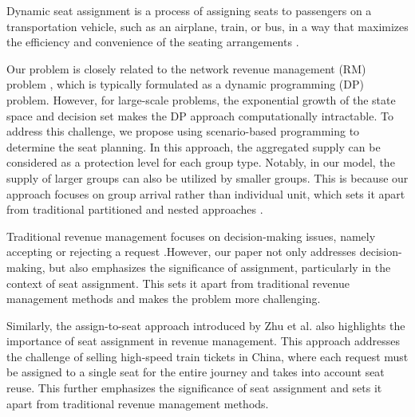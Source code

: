 Dynamic seat assignment is a process of assigning seats to passengers on a transportation vehicle, such as an airplane, train, or bus, in a way that maximizes the efficiency and convenience of the seating arrangements \cite{hamdouch2011schedule, berge1993demand, zhu2023assign}. 

Our problem is closely related to the network revenue management (RM) problem \cite{williamson1992airline}, which is typically formulated as a dynamic programming (DP) problem. However, for large-scale problems, the exponential growth of the state space and decision set makes the DP approach computationally intractable. To address this challenge, we propose using scenario-based programming \cite{feng2013scenario, casey2005scenario, henrion2018problem} to determine the seat planning. In this approach, the aggregated supply can be considered as a protection level for each group type. Notably, in our model, the supply of larger groups can also be utilized by smaller groups. This is because our approach focuses on group arrival rather than individual unit, which sets it apart from traditional partitioned and nested approaches \cite{curry1990optimal, van2008simulation}.


Traditional revenue management focuses on decision-making issues, namely accepting or rejecting a request \cite{gallego1997multiproduct}.However, our paper not only addresses decision-making, but also emphasizes the significance of assignment, particularly in the context of seat assignment. This sets it apart from traditional revenue management methods and makes the problem more challenging.

Similarly, the assign-to-seat approach introduced by Zhu et al. \cite{zhu2023assign} also highlights the importance of seat assignment in revenue management. This approach addresses the challenge of selling high-speed train tickets in China, where each request must be assigned to a single seat for the entire journey and takes into account seat reuse. This further emphasizes the significance of seat assignment and sets it apart from traditional revenue management methods.





